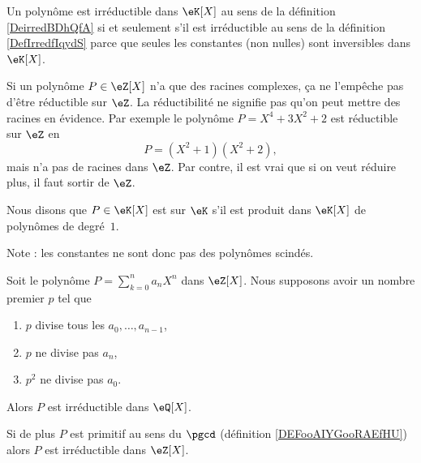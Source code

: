     Un polynôme est irréductible dans \( \eK[X]\) au sens de la définition \ref{DeirredBDhQfA} si et seulement s'il est irréductible au sens de la définition \ref{DefIrredfIqydS} parce que seules les constantes (non nulles) sont inversibles dans \( \eK[X]\).

\begin{example}
    Si un polynôme \( P\in \eZ[X]\) n'a que des racines complexes, ça ne l'empêche pas d'être réductible sur \( \eZ\). La réductibilité ne signifie pas qu'on peut mettre des racines en évidence. Par exemple le polynôme \( P=X^4+3X^2+2\) est réductible sur \( \eZ\) en
    \begin{equation}
        P=(X^2+1)(X^2+2),
    \end{equation}
    mais n'a pas de racines dans \( \eZ\). Par contre, il est vrai que si on veut réduire plus, il faut sortir de \( \eZ\).

\end{example}

\begin{definition}  \label{DefCPLSooQaHJKQ}
    Nous disons que \( P\in\eK[X]\) est  sur \(\eK\) s'il est produit dans \(\eK[X]\) de polynômes de degré~\( 1\). 
\end{definition}
Note : les constantes ne sont donc pas des polynômes scindés.

\begin{proposition}
    Soit le polynôme \( P=\sum_{k=0}^n a_nX^n\) dans \( \eZ[X]\). Nous supposons avoir un nombre premier \( p\) tel que
    \begin{enumerate}
        \item
            \( p\) divise tous les \( a_0,\ldots, a_{n-1}\),
        \item
            \( p\) ne divise pas \( a_n\),
        \item
            \( p^2\) ne divise pas \( a_0\).
    \end{enumerate}
    Alors \( P\) est irréductible dans \( \eQ[X]\).

    Si de plus \( P\) est primitif au sens du \( \pgcd\) (définition \ref{DEFooAIYGooRAEfHU}) alors \( P\) est irréductible dans \( \eZ[X]\).
\end{proposition}


